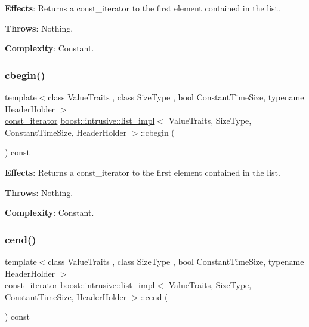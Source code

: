 {\bfseries Effects}\+: Returns a const\+\_\+iterator to the first element contained in the list.

{\bfseries Throws}\+: Nothing.

{\bfseries Complexity}\+: Constant. \mbox{\label{classboost_1_1intrusive_1_1list__impl_adc17ab4f4ca5c3817adf62960dec3d40}} 
\subsubsection{\texorpdfstring{cbegin()}{cbegin()}}
{\footnotesize\ttfamily template$<$class Value\+Traits , class Size\+Type , bool Constant\+Time\+Size, typename Header\+Holder $>$ \\
\hyperlink{classboost_1_1intrusive_1_1list__impl_af4ced710fe02662c5650d161af83d8cd}{const\+\_\+iterator} \hyperlink{classboost_1_1intrusive_1_1list__impl}{boost\+::intrusive\+::list\+\_\+impl}$<$ Value\+Traits, Size\+Type, Constant\+Time\+Size, Header\+Holder $>$\+::cbegin (\begin{DoxyParamCaption}{ }\end{DoxyParamCaption}) const\hspace{0.3cm}{\ttfamily [inline]}}

{\bfseries Effects}\+: Returns a const\+\_\+iterator to the first element contained in the list.

{\bfseries Throws}\+: Nothing.

{\bfseries Complexity}\+: Constant. \mbox{\label{classboost_1_1intrusive_1_1list__impl_ab683bf5010edc6008b3c6e0adbc33b70}} 
\subsubsection{\texorpdfstring{cend()}{cend()}}
{\footnotesize\ttfamily template$<$class Value\+Traits , class Size\+Type , bool Constant\+Time\+Size, typename Header\+Holder $>$ \\
\hyperlink{classboost_1_1intrusive_1_1list__impl_af4ced710fe02662c5650d161af83d8cd}{const\+\_\+iterator} \hyperlink{classboost_1_1intrusive_1_1list__impl}{boost\+::intrusive\+::list\+\_\+impl}$<$ Value\+Traits, Size\+Type, Constant\+Time\+Size, Header\+Holder $>$\+::cend (\begin{DoxyParamCaption}{ }\end{DoxyParamCaption}) const\hspace{0.3cm}{\ttfamily [inline]}}

